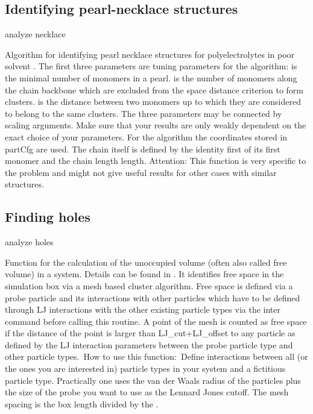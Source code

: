 \subsection{Identifying pearl-necklace structures}
\label{analyze:necklace}

\begin{essyntax}
 analyze necklace   
  
\end{essyntax}
Algorithm for identifying pearl necklace structures for
polyelectrolytes in poor solvent \citep{limbach03a}. The first three
parameters are tuning parameters for the algorithm:
 is the minimal number of monomers in a pearl.
 is the number of monomers along the chain backbone
which are excluded from the space distance criterion to form clusters.
 is the distance between two monomers up to which
they are considered to belong to the same clusters. The three
parameters may be connected by scaling arguments. Make sure that your
results are only weakly dependent on the exact choice of your
parameters. For the algorithm the coordinates stored in partCfg are
used. The chain itself is defined by the identity first of its first
monomer and the chain length length.  Attention: This function is very
specific to the problem and might not give useful results for other
cases with similar structures.

\subsection{Finding holes}
\label{analyze:holes}

\begin{essyntax}
  analyze holes   
\end{essyntax}
Function for the calculation of the unoccupied volume (often also
called free volume) in a system. Details can be found in
\citet{schmitz00a}.  It identifies free space in the simulation box
via a mesh based cluster algorithm.  Free space is defined via a probe
particle and its interactions with other particles which have to be
defined through LJ interactions with the other existing particle types
via the inter command before calling this routine. A point of the mesh
is counted as free space if the distance of the point is larger than
LJ_cut+LJ_offset to any particle as defined by the LJ interaction
parameters between the probe particle type and other particle types.\
How to use this function:\ Define interactions between all (or the
ones you are interested in) particle types in your system and a
fictitious particle type.  Practically one uses the van der Waals radius
of the particles plus the size of the probe you want to use as the
Lennard Jones cutoff. The mesh spacing is the box length divided by
the \var{mesh_size}.

